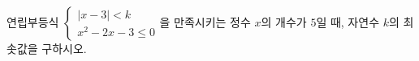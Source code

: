 \hspace*{2mm}\begin{minipage}[t]{\dimexpr\linewidth-2mm\relax}\vspace{0pt}
연립부등식 $\begin{cases} |x-3|<k \\ x^2-2x-3\le 0 \end{cases}$을 만족시키는 정수 $x$의 개수가 $5$일 때, 자연수 $k$의 최솟값을 구하시오.\end{minipage}
